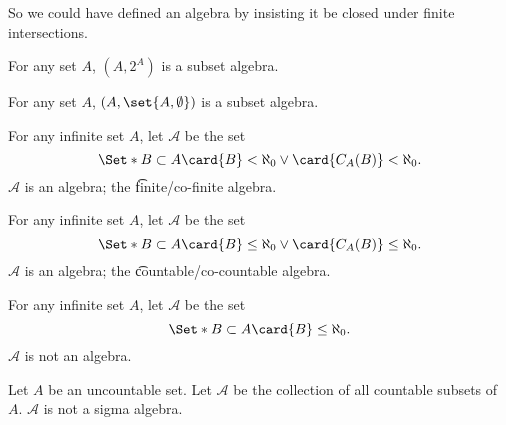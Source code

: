 So we could have defined an algebra
by insisting it be closed under finite
intersections.


\begin{expl}
  For any set $A$, $(A, 2^{A})$ is a subset algebra.
\end{expl}

\begin{expl}
  For any set $A$, $(A, \set{A, \emptyset})$ is a subset algebra.
\end{expl}

\begin{expl}
  For any infinite set $A$,
  let $\mathcal{A}$ be the set
  $$
  \Set*{
    B \subset A
  }{
    \card{B} < \aleph_0 \lor
    \card{C_{A}(B)} < \aleph_0
  }.
  $$
  $\mathcal{A}$ is an algebra;
  the
  \t{finite/co-finite algebra}.
\end{expl}

\begin{expl}
  For any infinite set $A$,
  let $\mathcal{A}$ be the set
  $$
  \Set*{
    B \subset A
  }{
    \card{B} \leq \aleph_0 \lor
    \card{C_{A}(B)} \leq \aleph_0
  }.
  $$
  $\mathcal{A}$ is an algebra;
  the
  \t{countable/co-countable algebra}.
\end{expl}


\begin{expl}
  For any infinite set $A$,
  let $\mathcal{A}$ be the set
  $$
  \Set*{
    B \subset A
  }{
    \card{B} \leq \aleph_0
  }.
  $$
  $\mathcal{A}$ is not an algebra.
\end{expl}

\begin{expl}
  Let $A$ be an uncountable set.
  Let $\mathcal{A}$ be the collection
  of all countable subsets of $A$.
  $\mathcal{A}$ is not a sigma algebra.
\end{expl}
